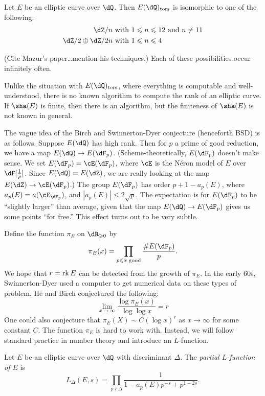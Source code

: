 \documentclass{article}
\begin{document}
\begin{theorem}
Let $E$ be an elliptic curve over $\dQ$. Then $E(\dQ)_\textnormal{tors}$ is 
isomorphic to one of the following:
\begin{align*}
  \dZ/n & \text{ with $1\leqslant n\leqslant 12$ and $n\ne 11$} \\
  \dZ/2\oplus \dZ/2 n & \text{ with $1\leqslant n\leqslant 4$}
\end{align*}
\end{theorem}
(Cite Mazur's paper\ldots mention his techniques.) 
Each of these possibilities occur infinitely often.

Unlike the situation with $E(\dQ)_\text{tors}$, where everything is computable 
and well-understood, there is no known algorithm to compute the rank of an 
elliptic curve. If $\sha(E)$ is finite, then there is an algorithm, but the 
finiteness of $\sha(E)$ is not known in general. 

The vague idea of the Birch and Swinnerton-Dyer conjecture (henceforth BSD) is 
as follows. Suppose $E(\dQ)$ has high rank. Then for $p$ a prime of good 
reduction, we have a map $E(\dQ) \to E(\dF_p)$. (Scheme-theoretically, 
$E(\dF_p)$ doesn't make sense. We set $E(\dF_p) = \cE(\dF_p)$, where 
$\cE$ is the N\'eron model of $E$ over $\dF[\frac 1 p]$. Since 
$E(\dQ) = E(\dZ)$, we are really looking at the map 
$E(\dZ) \to \cE(\dF_p)$.) The group $E(\dF_p)$ has order 
$p+1-a_p(E)$, where $a_p(E) = a(\cE_{\dF_p})$, and 
$|a_p(E)|\leqslant 2\sqrt p$. The expectation is for $E(\dF_p)$ to be 
``slightly larger'' than average, given that the map 
$E(\dQ) \to E(\dF_p)$ gives us some points ``for free.'' This effect turns out 
to be very subtle. 

Define the function $\pi_E$ on $\dR_{\geqslant 0}$ by 
\[
  \pi_E(x) = \prod_{p\leqslant x \text{ good}} \frac{\# E(\dF_p)}{p} \text{.}
\]
We hope that $r=\operatorname{rk} E$ can be detected from the growth of $\pi_E$. In the 
early 60s, Swinnerton-Dyer used a computer to get numerical data on these 
types of problem. He and Birch conjectured the following: 
\[
  \lim_{x\to \infty} \frac{\log \pi_E(x)}{\log \log x} = r
\]
One could also conjecture that $\pi_E(X) \sim C (\log x)^r$ as $x\to \infty$ 
for some constant $C$. The function $\pi_E$ is hard to work with. Instead, we 
will follow standard practice in number theory and introduce an $L$-function. 

\begin{definition}
Let $E$ be an elliptic curve over $\dQ$ with discriminant $\Delta$. The 
\emph{partial $L$-function of $E$} is 
\[
  L_\Delta(E,s) = \prod_{p\nmid \Delta} \frac{1}{1-a_p(E) p^{-s} + p^{1-2s}} \text{.}
\]
\end{definition}
\end{document}
